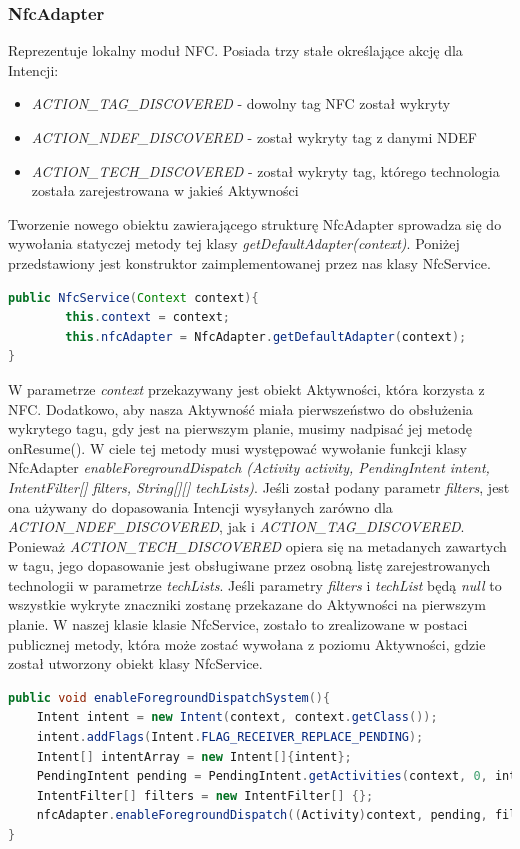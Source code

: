 \documentclass{article}
\numberwithin{equation}{section}
\begin{document}
\subsubsection{NfcAdapter}
Reprezentuje lokalny moduł NFC. Posiada trzy stałe określające akcję dla Intencji:
\begin{itemize}
    \item \textit{ACTION\_TAG\_DISCOVERED} - dowolny tag NFC został wykryty
    \item \textit{ACTION\_NDEF\_DISCOVERED} - został wykryty tag z danymi NDEF
    \item \textit{ACTION\_TECH\_DISCOVERED} - został wykryty tag, którego technologia została zarejestrowana w jakieś Aktywności
\end{itemize}
Tworzenie nowego obiektu zawierającego strukturę NfcAdapter sprowadza się do wywołania statyczej metody tej klasy \textit{getDefaultAdapter(context)}. Poniżej przedstawiony jest konstruktor zaimplementowanej przez nas klasy NfcService. 
\begin{lstlisting}[language=Java]
public NfcService(Context context){
        this.context = context;
        this.nfcAdapter = NfcAdapter.getDefaultAdapter(context);
}
\end{lstlisting}
W parametrze \textit{context} przekazywany jest obiekt Aktywności, która korzysta z NFC. Dodatkowo, aby nasza Aktywność miała pierwszeństwo do obsłużenia wykrytego tagu, gdy jest na pierwszym planie, musimy nadpisać jej metodę onResume(). W ciele tej metody musi występować wywołanie funkcji klasy NfcAdapter \textit{enableForegroundDispatch (Activity activity, PendingIntent intent, IntentFilter[] filters, String[][] techLists)}. Jeśli został podany parametr \textit{filters}, jest ona używany do dopasowania Intencji wysyłanych zarówno dla \textit{ACTION\_NDEF\_DISCOVERED}, jak i \textit{ACTION\_TAG\_DISCOVERED}. Ponieważ \textit{ACTION\_TECH\_DISCOVERED} opiera się na metadanych zawartych w tagu, jego dopasowanie jest obsługiwane przez osobną listę zarejestrowanych technologii w parametrze \textit{techLists}. Jeśli parametry \textit{filters} i \textit{techList} będą \textit{null} to wszystkie wykryte znaczniki zostanę przekazane do Aktywności na pierwszym planie. W naszej klasie klasie NfcService, zostało to zrealizowane w postaci publicznej metody, która może zostać wywołana z poziomu Aktywności, gdzie został utworzony obiekt klasy NfcService.
\begin{lstlisting}[language=Java]
public void enableForegroundDispatchSystem(){
    Intent intent = new Intent(context, context.getClass());
    intent.addFlags(Intent.FLAG_RECEIVER_REPLACE_PENDING);
    Intent[] intentArray = new Intent[]{intent};
    PendingIntent pending = PendingIntent.getActivities(context, 0, intentArray, 0);
    IntentFilter[] filters = new IntentFilter[] {};
    nfcAdapter.enableForegroundDispatch((Activity)context, pending, filters, null);
}
\end{lstlisting}
\end{document}
